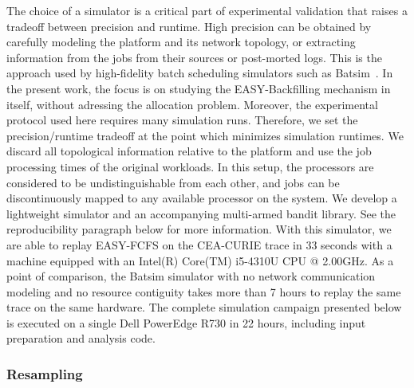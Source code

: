 \documentclass[sigconf,review,anonymous]{acmart}
\begin{document}
The choice of a simulator is a critical part of experimental validation that
raises a tradeoff between precision and runtime. High precision can be obtained
by carefully modeling the platform and its network topology, or extracting
information from the jobs from their sources or post-morted logs. This is the
approach used by high-fidelity batch scheduling simulators such as
Batsim~\cite{batsim}. In the present work, the focus is on studying the
EASY-Backfilling mechanism in itself, without adressing the allocation problem.
Moreover, the experimental protocol used here requires many simulation runs.
Therefore, we set the precision/runtime tradeoff at the point which minimizes
simulation runtimes. We discard all topological information relative to the
platform and use the job processing times of the original workloads. In this
setup, the processors are considered to be undistinguishable from each other,
and jobs can be discontinuously mapped to any available processor on the
system. We develop a lightweight simulator\cite{ocst} and an accompanying
multi-armed bandit library\cite{obandit}. See the reproducibility paragraph
below for more information.  With this simulator, we are able to replay
EASY-FCFS on the CEA-CURIE trace in 33 seconds with a machine equipped with an
Intel(R) Core(TM) i5-4310U CPU @ 2.00GHz. As a point of comparison, the Batsim
simulator with no network communication modeling and no resource contiguity
takes more than 7 hours to replay the same trace on the same hardware. The
complete simulation campaign presented below is executed on a single Dell
PowerEdge R730 in 22 hours, including input preparation and analysis code.

\subsubsection{Resampling}
\label{ssub:resampling}
\end{document}

